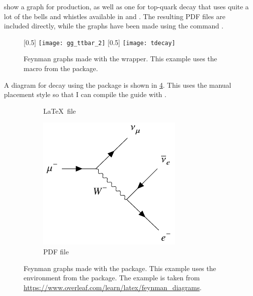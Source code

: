  show a graph for \ttbar production,
as well as one for top-quark decay that uses quite a lot of the bells and whistles available
in  and .
The resulting PDF files are included directly,
while the graphs have been made using the command .
\begin{figure}[htbp]
  \begin{tcblisting}{}
  \centering
    [0.5\figwidth]{%
      \texttt{[image: gg\_ttbar\_2]}
  }
  \qquad
    [0.5\figwidth]{%
    \texttt{[image: tdecay]}
  }
  \end{tcblisting}
  \caption{Feynman graphs made with the  wrapper.
    This example uses the  macro from the  package.}%
  \label{fig:pyfeynhand}
\end{figure}

A diagram for \Pgm decay using the  package
is shown in \cref{fig:feyn:mudecay}.
This uses the manual placement style so that I can compile the guide with .

\begin{figure}[htbp]
  \centering
  \begin{subfigure}{0.6\figwidth}
    \centering
    
    \caption{\LaTeX\ file}%
    \label{fig:feyn:mudecay1}
  \end{subfigure}
  \qquad
  \begin{subfigure}{0.4\figwidth}
    \centering
    \includegraphics[width=0.4\figwidth]{../tikz/mudecay-feynman}
    \caption{PDF file}%
    \label{fig:feyn:mudecay2}
  \end{subfigure}
  \caption{Feynman graphs made with the  package.
    This example uses the  environment from the  package.
    The example is taken from \url{https://www.overleaf.com/learn/latex/feynman_diagrams}.}%
  \label{fig:feyn:mudecay}
\end{figure}

